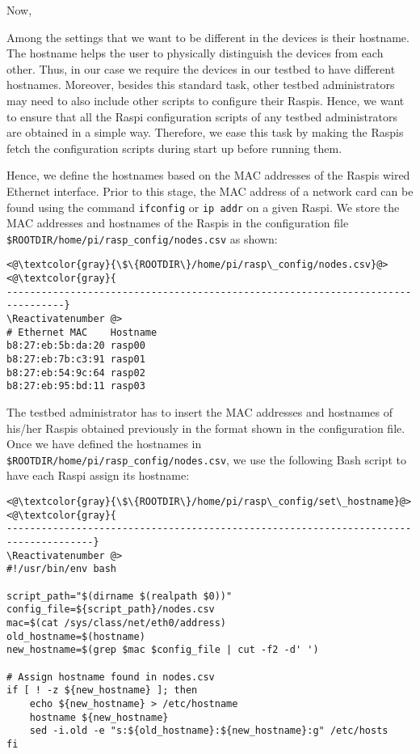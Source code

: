Now,

Among the settings that we want to be different in the devices is
their hostname. The hostname helps the user to physically distinguish the
devices from each other. Thus, in our case we require the devices in our
testbed to have different hostnames. Moreover, besides this standard task,
other testbed administrators may need to also include other scripts to
configure their \ac{Raspi}s. Hence, we want to ensure that all the \ac{Raspi}
configuration scripts of any testbed administrators are obtained in a simple
way. Therefore, we ease this task by making the \ac{Raspi}s fetch the
configuration scripts during start up before running them.

Hence, we define the hostnames based on the \ac{MAC} addresses
of the \ac{Raspi}s wired Ethernet interface. Prior to this stage, the
\ac{MAC} address of a network card can be found using the command
\texttt{ifconfig} or \texttt{ip addr} on a given \ac{Raspi}.
We store the \ac{MAC} addresses and hostnames of the \ac{Raspi}s in the
configuration file \texttt{\${ROOTDIR}/home/pi/rasp\_config/nodes.csv} as
shown:

\Suppressnumber\begin{lstlisting}[]
<@\textcolor{gray}{\$\{ROOTDIR\}/home/pi/rasp\_config/nodes.csv}@>
<@\textcolor{gray}{
--------------------------------------------------------------------------------}
\Reactivatenumber @>
# Ethernet MAC    Hostname
b8:27:eb:5b:da:20 rasp00
b8:27:eb:7b:c3:91 rasp01
b8:27:eb:54:9c:64 rasp02
b8:27:eb:95:bd:11 rasp03
\end{lstlisting}
\FloatBarrier
\vspace{-5mm}

The testbed administrator has to insert the \ac{MAC} addresses and hostnames
of his/her \ac{Raspi}s obtained previously in the format shown in the
configuration file. Once we have defined the hostnames in
\texttt{\${ROOTDIR}/home/pi/rasp\_config/nodes.csv}, we use the following
\ac{Bash} script to have each \ac{Raspi} assign its hostname:

\Suppressnumber\begin{lstlisting}[]
<@\textcolor{gray}{\$\{ROOTDIR\}/home/pi/rasp\_config/set\_hostname}@>
<@\textcolor{gray}{
-------------------------------------------------------------------------------------}
\Reactivatenumber @>
#!/usr/bin/env bash

script_path="$(dirname $(realpath $0))"
config_file=${script_path}/nodes.csv
mac=$(cat /sys/class/net/eth0/address)
old_hostname=$(hostname)
new_hostname=$(grep $mac $config_file | cut -f2 -d' ')

# Assign hostname found in nodes.csv
if [ ! -z ${new_hostname} ]; then
    echo ${new_hostname} > /etc/hostname
    hostname ${new_hostname}
    sed -i.old -e "s:${old_hostname}:${new_hostname}:g" /etc/hosts
fi
\end{lstlisting}
\FloatBarrier
\vspace{-5mm}

